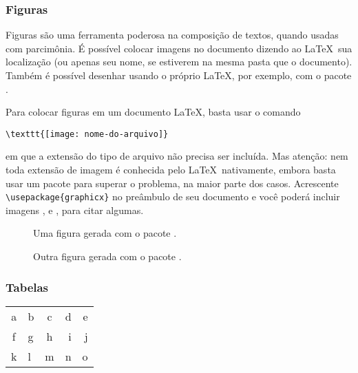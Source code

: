 
\subsubsection{Figuras}

Figuras são uma ferramenta poderosa na composição de textos, quando
usadas com parcimônia. É possível colocar imagens no documento dizendo
ao \LaTeX\ sua localização (ou apenas seu nome, se estiverem na mesma
pasta que o documento). Também é possível desenhar usando o próprio
\LaTeX, por exemplo, com o pacote .

Para colocar figuras em um documento \LaTeX, basta usar o comando
\begin{center}
\verb!\texttt{[image: nome-do-arquivo]}!
\end{center}
em que a extensão do tipo de arquivo não precisa ser incluída. Mas
atenção: nem toda extensão de imagem é conhecida pelo
\LaTeX\ nativamente, embora basta usar um pacote para superar o
problema, na maior parte dos casos. Acrescente
\verb!\usepackage{graphicx}! no preâmbulo de seu documento e você
poderá incluir imagens ,  e
, para citar algumas.

\begin{figure}
  \begin{center}
    
    \caption{Uma figura gerada com o pacote .}\label{fig:tikz:piramide-cortada}
  \end{center}
\end{figure}


\begin{figure}
  \begin{center}
    
    \caption{Outra figura gerada com o pacote .}\label{fig:tikz:layers}
  \end{center}
\end{figure}

\subsubsection{Tabelas}\label{sec:tabelas}

\begin{center}
\begin{tabular}{clcr|r|}
  a & b & c & d & e\\
  f & g & h & i & j\\
  \hline
  k & l & m & n & o
\end{tabular}
\end{center}


